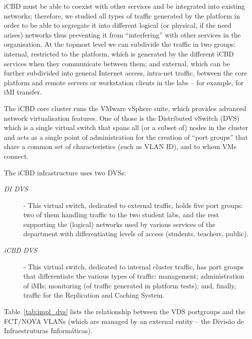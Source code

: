 iCBD must be able to coexist with other services and be integrated into existing networks; therefore, we studied all types of traffic generated by the platform in order to be able to segregate it into different logical (or physical, if the need arises) networks thus preventing it from “interfering” with other services in the organisation.
At the topmost level we can subdivide the traffic in two groups: internal, restricted to the platform, which is generated by the different iCBD services when they communicate between them; and external, which can be further subdivided into general Internet access, intra-net traffic, between the core platform and remote servers or workstation clients in the labs – for example, for iMI transfer.

The iCBD core cluster runs the VMware vSphere suite, which provides advanced network virtualisation features. One of those is the Distributed vSwitch (DVS) which is a single virtual switch that spans all (or a subset of) nodes in the cluster and acts as a single point of administration for the creation of “port groups” that share a common set of characteristics (such as VLAN ID), and to whom VMs connect.

The iCBD infrastructure uses two DVSs:

\begin{description}
	\item [\textit{DI DVS}] - This virtual switch, dedicated to external traffic, holds five port groups: two of them handling traffic to the two student labs, and the rest supporting the (logical) networks used by various services of the department with differentiating levels of access (students, teachers, public).
	\item [\textit{iCBD DVS}] - This virtual switch, dedicated to internal cluster traffic, has port groups that differentiate the various types of traffic: management; administration of iMIs; monitoring (of traffic generated in platform tests); and, finally, traffic for the Replication and Caching System.
\end{description}

Table~\ref{tab:impl_dvs} lists the relationship between the VDS portgroups and the FCT/NOVA VLANs (which are managed by an external entity – the Divisão de Infraestruturas Informáticas).

